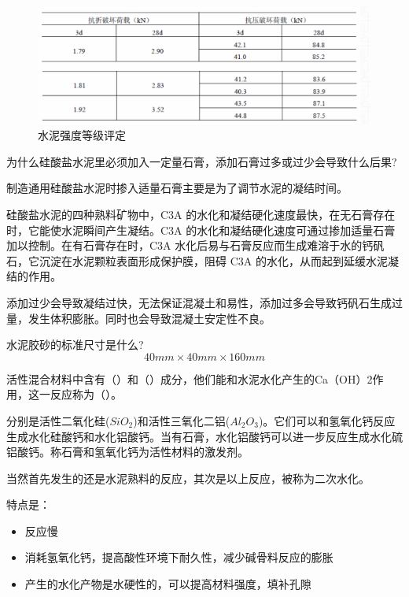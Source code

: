 \documentclass[12pt, a4paper, oneside, UTF8]{ctexbook}
\begin{document}
\begin{figure}[H]
	\centering
	\includegraphics[width=0.7\linewidth]{../figure/qiangdudengji.png} %
	\caption{水泥强度等级评定}
	\label{fig:qiangdudengji}
\end{figure}

\begin{example}
	为什么硅酸盐水泥里必须加入一定量石膏，添加石膏过多或过少会导致什么后果?

	制造通用硅酸盐水泥时掺入适量石膏主要是为了调节水泥的凝结时间。

硅酸盐水泥的四种熟料矿物中，C3A 的水化和凝结硬化速度最快，在无石膏存在时，它能使水泥瞬间产生凝结。C3A 的水化和凝结硬化速度可通过掺加适量石膏加以控制。在有石膏存在时，C3A 水化后易与石膏反应而生成难溶于水的钙矾石，它沉淀在水泥颗粒表面形成保护膜，阻碍 C3A 的水化，从而起到延缓水泥凝结的作用。

添加过少会导致凝结过快，无法保证混凝土和易性，添加过多会导致钙矾石生成过量，发生体积膨胀。同时也会导致混凝土安定性不良。

\end{example}

\begin{example}
	水泥胶砂的标准尺寸是什么?
	$$40mm \times 40mm \times 160mm$$
\end{example}

\begin{example}
	活性混合材料中含有（）和（）成分，他们能和水泥水化产生的Ca（OH）2作用，这一反应称为（）。

	分别是活性二氧化硅($SiO_2$)和活性三氧化二铝($Al_2O_3$)。它们可以和氢氧化钙反应生成水化硅酸钙和水化铝酸钙。当有石膏，水化铝酸钙可以进一步反应生成水化硫铝酸钙。称石膏和氢氧化钙为活性材料的激发剂。

当然首先发生的还是水泥熟料的反应，其次是以上反应，被称为二次水化。

特点是：

\begin{itemize}
	\item 反应慢
	\item 消耗氢氧化钙，提高酸性环境下耐久性，减少碱骨料反应的膨胀
	\item 产生的水化产物是水硬性的，可以提高材料强度，填补孔隙
\end{itemize}
\end{example}
\end{document}
